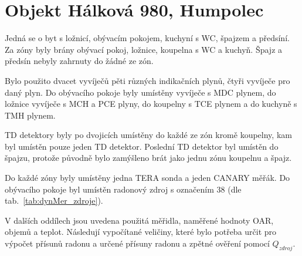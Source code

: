 \section{Objekt Hálková 980, Humpolec}
Jedná se o byt s ložnicí, obývacím pokojem, kuchyní s WC, špajzem a předsíní. Za zóny byly brány obývací pokoj, ložnice, koupelna s WC a kuchyň. Špajz a předsín nebyly zahrnuty do žádné ze zón.

Bylo použito dvacet vyvíječů pěti různých indikačních plynů, čtyři vyvíječe pro daný plyn. Do obývacího pokoje byly umístěny vyvíječe s MDC plynem, do ložnice vyvíječe s MCH a PCE plyny, do koupelny s TCE plynem a do kuchyně s TMH plynem.

TD detektory byly po dvojicích umístěny do každé ze zón kromě koupelny, kam byl umístěn pouze jeden TD detektor. Poslední TD detektor byl umístěn do špajzu, protože původně bylo zamýšleno brát jako jednu zónu koupelnu a špajz. %

Do každé zóny byly umístěny jedna TERA sonda a jeden CANARY měřák. Do obývacího pokoje byl umístěn radonový zdroj s označením 38 (dle tab.~\ref{tab:dynMer_zdroje}).

V dalších oddílech jsou uvedena použitá měřidla, naměřené hodnoty OAR, objemů a teplot. Následují vypočítané veličiny, které bylo potřeba určit pro výpočet přísunů radonu a určené přísuny radonu a zpětné ověření pomocí $Q_{zdroj}$.




